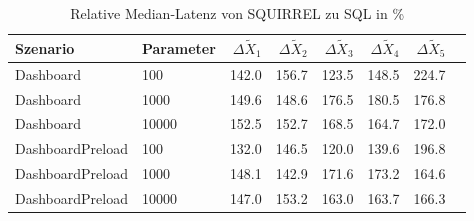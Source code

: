 
\begin{table}[ht]
\setlength{\extrarowheight}{-1pt}
\centering
\caption{Relative Median-Latenz von SQUIRREL zu SQL in \%}
\begin{tabular}{llrrrrrr}
\toprule
Szenario & Parameter & ${\Delta \tilde{X}_1}$ & ${\Delta \tilde{X}_2}$ & ${\Delta \tilde{X}_3}$ & ${\Delta \tilde{X}_4}$ & ${\Delta \tilde{X}_5}$ \\
\midrule
	Dashboard & 100 & \cellcolor{red!27}  142.0 & \cellcolor{red!30}  156.7 & \cellcolor{red!19}  123.5 & \cellcolor{red!29}  148.5 & \cellcolor{red!30}  224.7 \\
	Dashboard & 1000 & \cellcolor{red!30}  149.6 & \cellcolor{red!29}  148.6 & \cellcolor{red!30}  176.5 & \cellcolor{red!30}  180.5 & \cellcolor{red!30}  176.8 \\
	Dashboard & 10000 & \cellcolor{red!30}  152.5 & \cellcolor{red!30}  152.7 & \cellcolor{red!30}  168.5 & \cellcolor{red!30}  164.7 & \cellcolor{red!30}  172.0 \\
	DashboardPreload & 100 & \cellcolor{red!23}  132.0 & \cellcolor{red!29}  146.5 & \cellcolor{red!18}  120.0 & \cellcolor{red!26}  139.6 & \cellcolor{red!30}  196.8 \\
	DashboardPreload & 1000 & \cellcolor{red!29}  148.1 & \cellcolor{red!27}  142.9 & \cellcolor{red!30}  171.6 & \cellcolor{red!30}  173.2 & \cellcolor{red!30}  164.6 \\
	DashboardPreload & 10000 & \cellcolor{red!29}  147.0 & \cellcolor{red!30}  153.2 & \cellcolor{red!30}  163.0 & \cellcolor{red!30}  163.7 & \cellcolor{red!30}  166.3 \\
\bottomrule
\end{tabular}
\label{tab:relativer_durchsatz_squirrel}
\end{table}
	